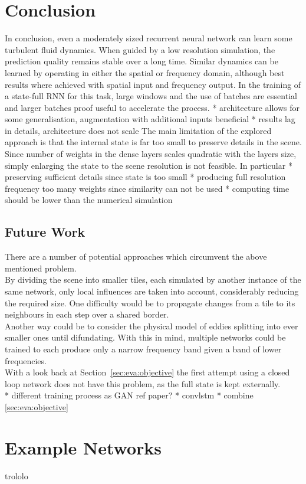 \documentclass[sigconf]{acmart}
\begin{document}
\section{Conclusion}
In conclusion, even a moderately sized recurrent neural network can learn some turbulent fluid dynamics. When guided by a low resolution simulation, the prediction quality remains stable over a long time.
Similar dynamics can be learned by operating in either the spatial or frequency domain, although best results where achieved with spatial input and frequency output.
In the training of a state-full RNN for this task, large windows and the use of batches are essential and larger batches proof useful to accelerate the process.
* architecture allows for some generalisation, augmentation with additional inputs beneficial
* results lag in details, architecture does not scale
The main limitation of the explored approach is that the internal state is far too small to preserve details in the scene. Since number of weights in the dense layers scales quadratic with the layers size, simply enlarging the state to the scene resolution is not feasible.
In particular 
* preserving sufficient details since state is too small
* producing full resolution frequency too many weights since similarity can not be used
* computing time should be lower than the numerical simulation
\subsection{Future Work}
There are a number of potential approaches which circumvent the above mentioned problem. \\
By dividing the scene into smaller tiles, each simulated by another instance of the same network, only local influences are taken into account, considerably reducing the required size. One difficulty would be to propagate changes from a tile to its neighbours in each step over a shared border.\\
Another way could be to consider the physical model of eddies splitting into ever smaller ones until difundating.
With this in mind, multiple networks could be trained to each produce only a narrow frequency band given a band of lower frequencies. \\
With a look back at Section~\ref{sec:eva:objective} the first attempt using a closed loop network does not have this problem, as the full state is kept externally. \\
* different training process as GAN ref paper?
* convlstm
* combine \ref{sec:eva:objective}


%


\appendix
\section{Example Networks}
trololo
\end{document}
